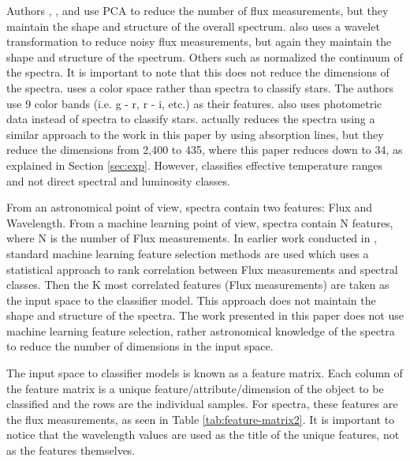 \documentclass[trackchanges, floatfix, twocolumn, tighten]{aastex62}
\begin{document}
Authors \cite{Xing}, \cite{Mahdi}, and \cite{Bailer} use PCA to reduce the number of flux measurements, but they maintain the shape and structure of the overall spectrum. \cite{Xing} also uses a wavelet transformation to reduce noisy flux measurements, but again they maintain the shape and structure of the spectrum. Others such as \cite{Luo} normalized the continuum of the spectra. It is important to note that this does not reduce the dimensions of the spectra. \cite{Bai} uses a color space rather than spectra to classify stars. The authors use 9 color bands (i.e. g - r, r - i, etc.) as their features. \cite{Elting} also uses photometric data instead of spectra to classify stars. \cite{Schierscher} actually reduces the spectra using a similar approach to the work in this paper by using absorption lines, but they reduce the dimensions from 2,400 to 435, where this paper reduces down to 34, as explained in Section \ref{sec:exp}. However, \cite{Schierscher} classifies effective temperature ranges and not direct spectral and luminosity classes.

From an astronomical point of view, spectra contain two features: Flux and Wavelength. From a machine learning point of view, spectra contain N features, where N is the number of Flux measurements. In earlier work conducted in \cite{brice}, standard machine learning feature selection methods are used which uses a statistical approach to rank correlation between Flux measurements and spectral classes. Then the K most correlated features (Flux measurements) are taken as the input space to the classifier model. This approach does not maintain the shape and structure of the spectra. The work presented in this paper does not use machine learning feature selection, rather astronomical knowledge of the spectra to reduce the number of dimensions in the input space. 

The input space to classifier models is known as a feature matrix. Each column of the feature matrix is a unique feature/attribute/dimension of the object to be classified and the rows are the individual samples. For spectra, these features are the flux measurements, as seen in Table \ref{tab:feature-matrix2}. It is important to notice that the wavelength values are used as the title of the unique features, not as the features themselves.
\end{document}
